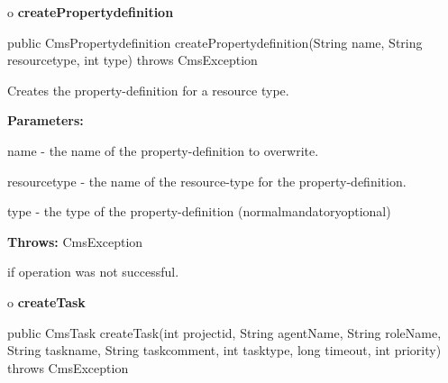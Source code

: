 o {\bf createPropertydefinition} 

\begin{PRE}
 public CmsPropertydefinition createPropertydefinition(String name,
                                                       String resourcetype,
                                                       int type) throws CmsException
\end{PRE}

\begin{description}
\htmlDD Creates the property-definition for a resource type. 

\begin{description}
\item {\bf Parameters:}  

name - the name of the property-definition to overwrite.  

resourcetype - the name of the resource-type for the property-definition.  

type - the type of the property-definition
(normal{\htmlBar}mandatory{\htmlBar}optional)  
\item {\bf Throws:} CmsException  

if operation was not successful.  
\end{description}

\end{description}

o {\bf createTask} 

\begin{PRE}
 public CmsTask createTask(int projectid,
                           String agentName,
                           String roleName,
                           String taskname,
                           String taskcomment,
                           int tasktype,
                           long timeout,
                           int priority) throws CmsException
\end{PRE}

